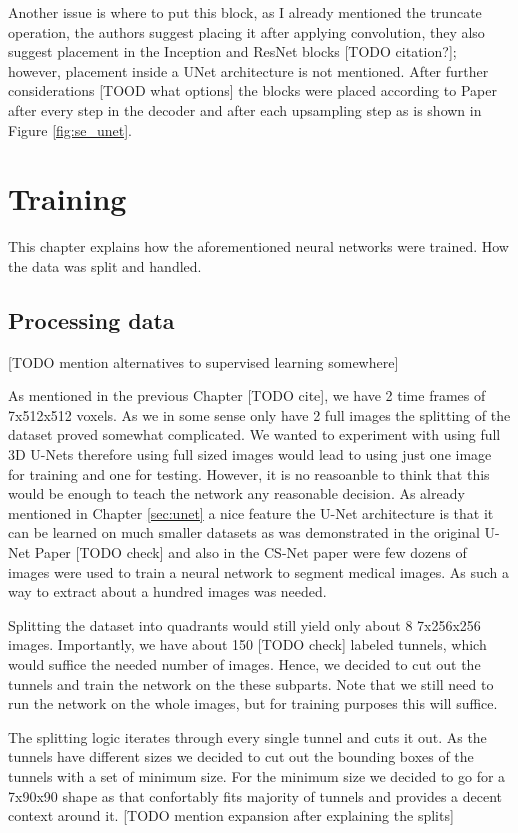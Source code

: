 \documentclass[
  digital,     %
  oneside,     %
  nosansbold,  %
  nocolorbold, %
  lof,         %
  lot,         %
]{fithesis4}
\begin{document}
Another issue is where to put this block, as I already mentioned the truncate
operation, the authors suggest placing it after applying convolution, they also
suggest placement in the Inception and ResNet blocks [TODO citation?]; however,
placement inside a UNet architecture is not mentioned. After further
considerations [TOOD what options] the blocks were placed according to Paper
\parencite{Rundo2019} after every step in the decoder and after each upsampling
step as is shown in Figure \ref{fig:se_unet}.

\chapter{Training}
This chapter explains how the aforementioned neural networks were trained. How
the data was split and handled.

\section{Processing data}
[TODO mention alternatives to supervised learning somewhere]

As mentioned in the previous Chapter [TODO cite], we have 2 time frames of
7x512x512 voxels. As we in some sense only have 2 full images the splitting of
the dataset proved somewhat complicated. We wanted to experiment with using full
3D U-Nets therefore using full sized images would lead to using just one image
for training and one for testing. However, it is no reasoanble to think that
this would be enough to teach the network any reasonable decision. As already
mentioned in Chapter \ref{sec:unet} a nice feature the U-Net architecture is
that it can be learned on much smaller datasets as was demonstrated in the
original U-Net Paper \parencite{Ronneberger2015} [TODO check] and also in the
CS-Net paper \parencite{Mou2021} were few dozens of images were used to train a
neural network to segment medical images. As such a way to extract about a
hundred images was needed.

Splitting the dataset into quadrants would still yield only about 8 7x256x256
images. Importantly, we have about 150 [TODO check] labeled tunnels, which would
suffice the needed number of images. Hence, we decided to cut out the tunnels
and train the network on the these subparts. Note that we still need to run the
network on the whole images, but for training purposes this will suffice.

The splitting logic iterates through every single tunnel and cuts it out. As the
tunnels have different sizes we decided to cut out the bounding boxes of the
tunnels with a set of minimum size. For the minimum size we decided to go for a
7x90x90 shape as that confortably fits majority of tunnels and provides a decent
context around it. [TODO mention expansion after explaining the splits]
\end{document}
